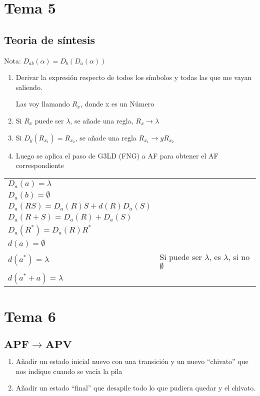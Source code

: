 \documentclass[12pt, twoside, openright]{report} %
\begin{document}
\section{Tema 5}
\subsection{Teoria de síntesis}
Nota: $D_{ab}(\alpha)= D_b(D_a(\alpha))$
\begin{enumerate}
	\item Derivar la expresión respecto de todos los símbolos y todas las que me vayan saliendo.

	      Las voy llamando $R_x$, donde x es un Número
	\item Si $R_x$ puede ser $\lambda$, se añade una regla, $R_x \rightarrow \lambda$
	\item Si $D_y(R_{x_1}) = R_{x_2}$, se añade una regla $R_{x_1} \rightarrow y R_{x_2}$
	\item Luego se aplica el paso de G3LD (FNG) a AF para obtener el AF correspondiente
\end{enumerate}
\begin{table}[H]
	\centering\begin{tabular}{ll}
		$D_a(a) = \lambda$ \\
		$D_a(b) = \emptyset$ \\
		$D_a(RS) = D_a(R)S + d(R)D_a(S)$ \\
		$D_a(R+S) = D_a(R) + D_a(S)$ \\
		$D_a(R^*) = D_a(R)R^*$ \\
		$d(a) = \emptyset$ \\
		$d(a^*) = \lambda$ & Si puede ser $\lambda$, es $\lambda$, si no $\emptyset$ \\
		$d(a^*+a) = \lambda$ \\
	\end{tabular}
\end{table}

\section{Tema 6}
\subsection{$\boldsymbol{APF \rightarrow APV}$}
\begin{enumerate}
	\item Añadir un estado inicial nuevo con una transición y un nuevo \enquote{chivato} que nos indique cuando se vacía la pila
	\item Añadir un estado \enquote{final} que desapile todo lo que pudiera quedar y el chivato.
\end{enumerate}
\end{document}

